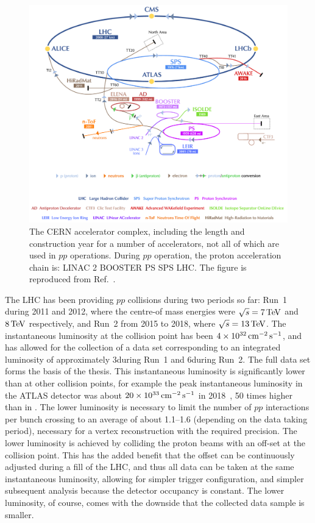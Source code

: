 \begin{figure}[tb]
    \centering
    \includegraphics[width=0.9\columnwidth]{figures/detector/CERN_complex.png}
    \caption{The CERN accelerator complex, including the length and construction year for a number of accelerators, not all of which are used in $pp$ operations. During $pp$ operation, the proton acceleration chain is: LINAC 2 \to BOOSTER \to PS \to SPS \to LHC.  The figure is reproduced from Ref.~\cite{CERNcomplex}.}
    \label{fig:CERN_accerators}
\end{figure}

The LHC has been providing $pp$ collisions during two periods so far: Run~1 during 2011 and 2012, where the centre-of mass energies were $\sqrt{s}=7\text{\,Te\kern -0.1em V}$ and $8\text{\,Te\kern -0.1em V}$ respectively, and Run~2 from 2015 to 2018, where $\sqrt{s}=13\text{\,Te\kern -0.1em V}$. The instantaneous luminosity at the \lhcb collision point has been $4\times 10^{32} \text{\,cm}^{-2} \,\mathrm s^{-1}$, and has allowed for the collection of a data set corresponding to an integrated luminosity of approximately 3\invfb during Run~1 and 6\invfb during Run~2. The full data set forms the basis of the thesis. This instantaneous luminosity is significantly lower than at other collision points, for example the peak instantaneous luminosity in the ATLAS detector was about $20\times 10^{33}\text{\,cm}^{-2}\,\mathrm s^{-1}$ in 2018~\cite{ATLAS-CONF-2019-021},  50 times higher than in \lhcb. The lower luminosity is necessary to limit the number of $pp$ interactions per bunch crossing to an average of about 1.1--1.6 (depending on the data taking period), necessary for a vertex reconstruction with the required precision. The lower luminosity is achieved by colliding the proton beams with an off-set at the \lhcb collision point. This has the added benefit that the offset can be continuously adjusted during a fill of the LHC, and thus all data can be taken at the same instantaneous luminosity, allowing for simpler trigger configuration, and simpler subsequent analysis because the detector occupancy is constant. The lower luminosity, of course, comes with the downside that the collected data sample is smaller.

